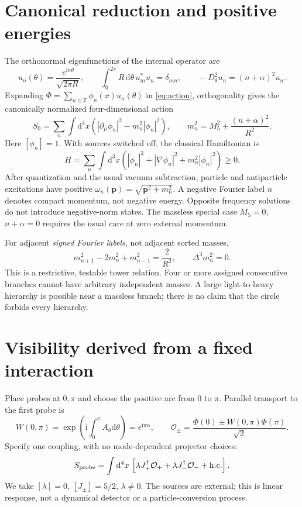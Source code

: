 \documentclass[11pt,a4paper]{article}
\newcommand{\dd}{\mathrm{d}}
\newcommand{\ii}{\mathrm{i}}
\newcommand{\cO}{\mathcal O}
\begin{document}
\section{Canonical reduction and positive energies}
The orthonormal eigenfunctions of the internal operator are
\begin{equation}
 u_n(\theta)=\frac{e^{\ii n\theta}}{\sqrt{2\pi R}},\qquad
 \int_0^{2\pi}R\,\dd\theta\,u_m^*u_n=\delta_{mn},\qquad
 -D_\theta^2u_n=(n+\alpha)^2u_n .
\end{equation}
Expanding $\Phi=\sum_{n\in\mathbb Z}\phi_n(x)u_n(\theta)$ in
\eqref{eq:action}, orthogonality gives the canonically normalized
four-dimensional action
\begin{equation}\label{eq:mass}
 S_0=\sum_n\int\dd^4x\left(
 |\partial_\mu\phi_n|^2-m_n^2|\phi_n|^2\right),\qquad
 \boxed{m_n^2=M_5^2+\frac{(n+\alpha)^2}{R^2}} .
\end{equation}
Here $[\phi_n]=1$. With sources switched off, the classical Hamiltonian is
\begin{equation}
 H=\sum_n\int\dd^3x\left(
 |\dot\phi_n|^2+|\nabla\phi_n|^2+m_n^2|\phi_n|^2\right)\geq0 .
\end{equation}
After quantization and the usual vacuum subtraction, particle and
antiparticle excitations have positive
$\omega_n(\boldsymbol p)=\sqrt{\boldsymbol p^2+m_n^2}$.
A negative Fourier label $n$ denotes compact momentum, not negative
energy. Opposite frequency solutions do not introduce negative-norm
states. The massless special case $M_5=0$, $n+\alpha=0$ requires the
usual care at zero external momentum.

For adjacent \emph{signed Fourier labels}, not adjacent sorted masses,
\begin{equation}\label{eq:diff}
 m_{n+1}^2-2m_n^2+m_{n-1}^2=\frac{2}{R^2},\qquad
 \Delta^3m_n^2=0 .
\end{equation}
This is a restrictive, testable tower relation. Four or more assigned
consecutive branches cannot have arbitrary independent masses.
A large light-to-heavy hierarchy is possible near a massless branch;
there is no claim that the circle forbids every hierarchy.

\section{Visibility derived from a fixed interaction}
Place probes at $0,\pi$ and choose the positive arc from $0$ to $\pi$.
Parallel transport to the first probe is
\begin{equation}
 W(0,\pi)=\exp\left(\ii\int_0^\pi A_\theta\dd\theta\right)
 =e^{\ii\pi\alpha},\qquad
 \cO_\pm=\frac{\Phi(0)\pm W(0,\pi)\Phi(\pi)}{\sqrt2}.
\end{equation}
Specify one coupling, with no mode-dependent projector choices:
\begin{equation}\label{eq:probe}
 S_{\rm probe}=\int\dd^4x\,
 \left[\lambda J_+^\dagger\cO_+
       +\lambda J_-^\dagger\cO_-+\mathrm{h.c.}\right].
\end{equation}
We take $[\lambda]=0$, $[J_\pm]=5/2$, $\lambda\ne0$.
The sources are external; this is linear response, not a dynamical
detector or a particle-conversion process.
\end{document}
